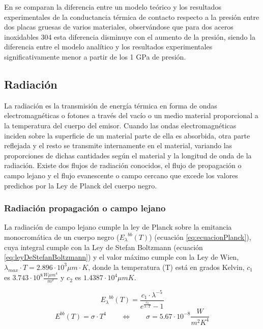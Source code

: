 En \cite{experimental_Rc_SS} se comparan la diferencia entre un modelo teórico y los resultados experimentales de la conductancia térmica de contacto respecto a la presión entre dos placas gruesas de varios materiales, observándose que para dos aceros inoxidables 304 esta diferencia disminuye con el aumento de la presión, siendo la diferencia entre el modelo analítico y los resultados experimentales significativamente menor a partir de los 1 GPa de presión.

\subsection{Radiación}
La radiación es la transmisión de energía térmica en forma de ondas electromagnéticas o fotones a través del vacío o un medio material proporcional a la temperatura del cuerpo del emisor. Cuando las ondas electromagnéticas inciden sobre la superficie de un material parte de ella es absorbida, otra parte reflejada y el resto se transmite internamente en el material, variando las proporciones de dichas cantidades según el material y la longitud de onda de la radiación. Existe dos flujos de radiación conocidos, el flujo de propagación o campo lejano y el flujo evanescente o campo cercano que excede los valores predichos por la Ley de Planck del cuerpo negro.\\

\subsubsection{Radiación propagación o campo lejano}
La radiación de campo lejano cumple la ley de Planck sobre la emitancia monocromática de un cuerpo negro (${E_{\lambda}}^{bb}(T)$) (ecuación \ref{eq:ecuacionPlanck}), cuya integral cumple con la Ley de Stefan Boltzmann (ecuación \ref{eq:leyDeStefanBoltzmann}) y el valor máximo cumple con la Ley de Wien, $\lambda_{max}\cdot T=2.896\cdot 10^3 \mu m\cdot K$, donde la temperatura (T) está en grados Kelvin, $c_1$ es $3.743\cdot 10^8 \frac{W\mu m^4}{m^2}$ y $c_2$ es $1.4387\cdot 10^4 \mu mK$.

\begin{equation}
{E_\lambda}^{bb}\left( T \right) = \dfrac{c_1\cdot \lambda^{-5}}{e^{\frac{c_2}{\lambda \cdot T}}-1}
\label{eq:ecuacionPlanck}
\end{equation}
\begin{equation}
{E}^{bb}\left( T \right)=\sigma \cdot T^4 \qquad \Longleftrightarrow \qquad \sigma = 5.67\cdot 10^{-8} \dfrac{W}{m^2 K^4}
\label{eq:leyDeStefanBoltzmann}
\end{equation}

